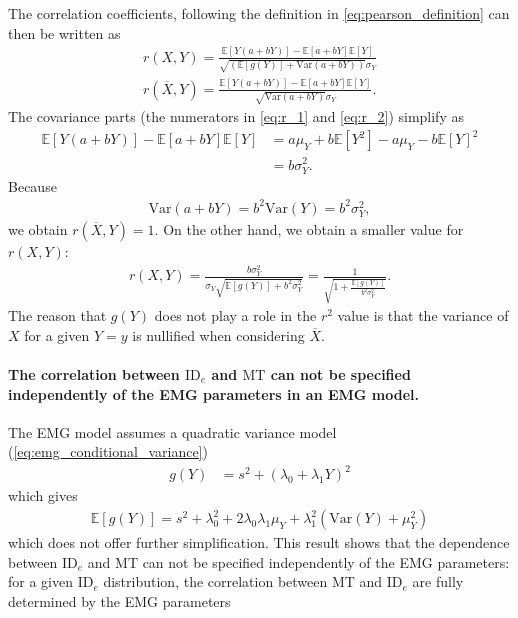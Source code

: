 \documentclass[acmlarge, manuscript,review]{acmart}
\newcommand{\mt}{\ensuremath{{\text{MT}}}\xspace}
\newcommand{\ide}{\ensuremath{{\text{ID}_e}}\xspace}
\begin{document}
The correlation coefficients, following the definition in \autoref{eq:pearson_definition} can then be written as
\begin{align}
  r(X,Y)  = \frac{\mathbb{E}[Y(a + bY)] - \mathbb{E}[a + bY]\mathbb{E}[Y] }{\sqrt{(\mathbb{E}[g(Y)] + \text{Var}(a + bY))}\sigma_Y} \label{eq:r_1} \\
  r(\overline{X}, Y) = \frac{\mathbb{E}[Y(a + bY)] - \mathbb{E}[a + bY]\mathbb{E}[Y] }{\sqrt{\text{Var}(a + bY)}\sigma_Y}. \label{eq:r_2}
\end{align}
The covariance parts (\ie the numerators in \autoref{eq:r_1} and \autoref{eq:r_2}) simplify as
\begin{align}
  \mathbb{E}[Y(a + bY)] - \mathbb{E}[a + bY]\mathbb{E}[Y] & = a \mu_Y + b\mathbb{E}[Y^2] - a\mu_Y - b\mathbb{E}[Y]^2 \\
  & = b\sigma_Y^2.
\end{align}
Because
\begin{align}
  \text{Var}(a + bY) = b^2\text{Var}(Y) = b^2\sigma_Y^2,
\end{align}
we obtain $r(\overline{X}, Y) = 1$. On the other hand, we obtain a smaller value for $r(X,Y)$:
\begin{align}
  r(X,Y) = \frac{b\sigma_Y^2}{\sigma_Y\sqrt{\mathbb{E}[g(Y)] + b^2\sigma_Y^2}} = \frac{1}{\sqrt{1 + \frac{\mathbb{E}[g(Y)]}{b^2\sigma_Y^2}}}.
\end{align}
The reason that $g(Y)$ does not play a role in the $r^2$ value is that the variance of $X$ for a given $Y=y$ is nullified when considering $\overline{X}$.

\paragraph{The correlation between \ide and \mt can not be specified independently of the EMG parameters in an EMG model.}
The EMG model assumes a quadratic variance model (\autoref{eq:emg_conditional_variance})
\begin{align}
  g(Y) & = s^2 + (\lambda_0  + \lambda_1 Y)^2
\end{align}
which gives
\begin{align}
  \mathbb{E}[g(Y)] = s^2 + \lambda_0^2 + 2\lambda_0\lambda_1\mu_Y + \lambda_1^2(\text{Var}(Y) + \mu_Y^2)
\end{align}
which does not offer further simplification. This result shows that the dependence between \ide and MT can not be specified independently of the EMG parameters: for a given \ide distribution, the correlation between \mt and \ide are fully determined by the EMG parameters
\end{document}
